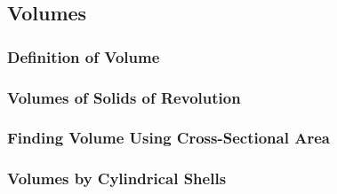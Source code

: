 \subsection{Volumes}

\subsubsection*{Definition of Volume}

\subsubsection*{Volumes of Solids of Revolution}

\subsubsection*{Finding Volume Using Cross-Sectional Area}

\subsubsection*{Volumes by Cylindrical Shells}